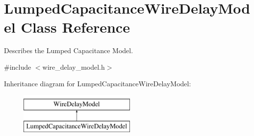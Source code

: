 \hypertarget{classLumpedCapacitanceWireDelayModel}{\section{Lumped\-Capacitance\-Wire\-Delay\-Model Class Reference}
\label{classLumpedCapacitanceWireDelayModel}
}


Describes the Lumped Capacitance Model.  




{\ttfamily \#include $<$wire\-\_\-delay\-\_\-model.\-h$>$}

Inheritance diagram for Lumped\-Capacitance\-Wire\-Delay\-Model\-:\begin{figure}[H]
\begin{center}
\leavevmode
\includegraphics[height=2.000000cm]{classLumpedCapacitanceWireDelayModel}
\end{center}
\end{figure}
